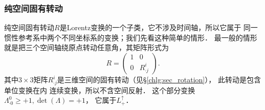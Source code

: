 \subsubsection{纯空间固有转动} %
纯空间固有转动$R$是Lorentz变换的一个子类，它不涉及时间轴，所以它属于
同一惯性参考系中两个不同坐标系的变换；我们先看这种简单的情形．
最一般的情形就是把三个空间轴绕原点转动任意角，其矩阵形式为
\begin{equation} \label{chlg:eqn_rotation-4d}
    R = \begin{pmatrix}
        1    & 0  \\
        0 & R^i_{\cdot j}  
    \end{pmatrix} .
\end{equation}
其中$3\times 3$矩阵$R^i_{\cdot j}$是三维空间的固有转动（见\S\ref{chlg:sec_rotation}），
此转动是包含单位变换在内
连续变换，所以不含空间反射． 这个部分变换
$\Lambda^{0}_{\cdot 0}\geqslant +1, \det(\Lambda)=+1$，
它属于$L^{\uparrow}_{+}$．




